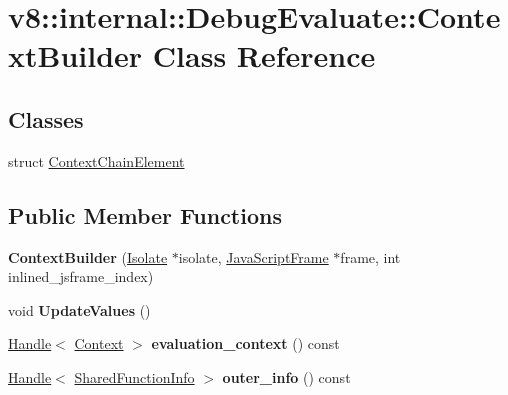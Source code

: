 \hypertarget{classv8_1_1internal_1_1_debug_evaluate_1_1_context_builder}{}\section{v8\+:\+:internal\+:\+:Debug\+Evaluate\+:\+:Context\+Builder Class Reference}
\label{classv8_1_1internal_1_1_debug_evaluate_1_1_context_builder}
\subsection*{Classes}
\begin{DoxyCompactItemize}
\item 
struct \hyperlink{structv8_1_1internal_1_1_debug_evaluate_1_1_context_builder_1_1_context_chain_element}{Context\+Chain\+Element}
\end{DoxyCompactItemize}
\subsection*{Public Member Functions}
\begin{DoxyCompactItemize}
\item 
{\bfseries Context\+Builder} (\hyperlink{classv8_1_1internal_1_1_isolate}{Isolate} $\ast$isolate, \hyperlink{classv8_1_1internal_1_1_java_script_frame}{Java\+Script\+Frame} $\ast$frame, int inlined\+\_\+jsframe\+\_\+index)\hypertarget{classv8_1_1internal_1_1_debug_evaluate_1_1_context_builder_abce883e1f454694e96a9e547513b46f3}{}\label{classv8_1_1internal_1_1_debug_evaluate_1_1_context_builder_abce883e1f454694e96a9e547513b46f3}

\item 
void {\bfseries Update\+Values} ()\hypertarget{classv8_1_1internal_1_1_debug_evaluate_1_1_context_builder_a99cadfa7552c119b38c4b9c4a5c5a511}{}\label{classv8_1_1internal_1_1_debug_evaluate_1_1_context_builder_a99cadfa7552c119b38c4b9c4a5c5a511}

\item 
\hyperlink{classv8_1_1internal_1_1_handle}{Handle}$<$ \hyperlink{classv8_1_1internal_1_1_context}{Context} $>$ {\bfseries evaluation\+\_\+context} () const \hypertarget{classv8_1_1internal_1_1_debug_evaluate_1_1_context_builder_a07cf3156b6152c6b71fd5f1aa32ac305}{}\label{classv8_1_1internal_1_1_debug_evaluate_1_1_context_builder_a07cf3156b6152c6b71fd5f1aa32ac305}

\item 
\hyperlink{classv8_1_1internal_1_1_handle}{Handle}$<$ \hyperlink{classv8_1_1internal_1_1_shared_function_info}{Shared\+Function\+Info} $>$ {\bfseries outer\+\_\+info} () const \hypertarget{classv8_1_1internal_1_1_debug_evaluate_1_1_context_builder_a7e6d18a45b6d8f33d92a3e3917285d71}{}\label{classv8_1_1internal_1_1_debug_evaluate_1_1_context_builder_a7e6d18a45b6d8f33d92a3e3917285d71}

\end{DoxyCompactItemize}
